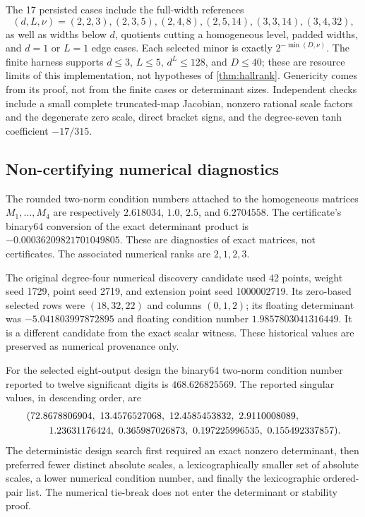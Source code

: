\documentclass[11pt,a4paper]{article}
\numberwithin{equation}{section}
\theoremstyle{definition}
\theoremstyle{remark}
\begin{document}
The 17 persisted cases include the full-width references
\[
 (d,L,\nu)=(2,2,3),(2,3,5),(2,4,8),(2,5,14),
              (3,3,14),(3,4,32),
\]
as well as widths below $d$, quotients cutting a homogeneous level,
padded widths, and $d=1$ or $L=1$ edge cases. Each selected minor is
exactly $2^{-\min(D,\nu)}$. The finite harness supports
$d\leq3$, $L\leq5$, $d^L\leq128$, and $D\leq40$; these are resource
limits of this implementation, not hypotheses of \cref{thm:hallrank}.
Genericity comes from its proof, not from the finite cases or determinant
sizes. Independent checks include a small complete truncated-map
Jacobian, nonzero rational scale factors and the degenerate zero scale,
direct bracket signs, and the degree-seven tanh coefficient $-17/315$.

\subsection{Non-certifying numerical diagnostics}
The rounded two-norm condition numbers attached to the homogeneous
matrices $M_1,\ldots,M_4$ are respectively
$2.618034$, $1.0$, $2.5$, and $6.2704558$. The certificate's binary64
conversion of the exact determinant product is
$-0.00036209821701049805$. These are diagnostics of exact matrices,
not certificates. The associated numerical ranks are $2,1,2,3$.

The original degree-four numerical discovery candidate used 42 points,
weight seed 1729, point seed 2719, and extension point seed 1000002719.
Its zero-based selected rows were $(18,32,22)$ and columns $(0,1,2)$;
its floating determinant was $-5.041803997872895$ and floating condition
number $1.9857803041316449$. It is a different candidate from the exact
scalar witness. These historical values are preserved as numerical
provenance only.

For the selected eight-output design the binary64 two-norm condition
number reported to twelve significant digits is $468.626825569$.
The reported singular values, in descending order, are
\begin{align*}
 &(72.8678806904,\ 13.4576527068,\ 12.4585453832,\ 2.9110008089,\\
 &\hspace{8mm}1.23631176424,\ 0.365987026873,\ 0.197225996535,
 \ 0.155492337857).
\end{align*}
The deterministic design search first required an exact nonzero
determinant, then preferred fewer distinct absolute scales, a
lexicographically smaller set of absolute scales, a lower numerical
condition number, and finally the lexicographic ordered-pair list.
The numerical tie-break does not enter the determinant or stability proof.
\end{document}
